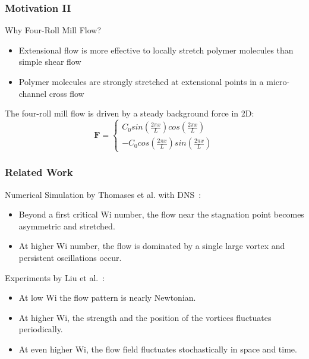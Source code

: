 \begin{frame}
  \frametitle{Motivation II}

  \begin{block}{Why Four-Roll Mill Flow?}
    \begin{itemize}
    \item Extensional flow is more effective to locally 
          stretch polymer molecules than simple shear flow
\item Polymer molecules are strongly stretched at extensional points in a micro-channel cross flow
    \end{itemize}

  \end{block}
The four-roll mill flow is driven by a steady background force in 2D:
\begin{equation}
\mathbf{F}=\left\{\begin{matrix}
C_0sin(\frac{2\pi x} {L})cos(\frac{2\pi x} {L})
\\ 
-C_0cos(\frac{2\pi x} {L})sin(\frac{2\pi x} {L})
\end{matrix}\right.
\end{equation}
\end{frame}

\begin{frame}
  \frametitle{Related Work}
\begin{block}{Numerical Simulation by Thomases et al. with DNS~\footnotemark: }
\begin{itemize}
 \item Beyond a first critical Wi number, the flow near the stagnation point becomes asymmetric and stretched.
\item At higher Wi number, the flow is dominated by a single large vortex and persistent oscillations occur. 
\end{itemize}
\end{block}
\begin{block}{Experiments by Liu et al.~\footnotemark[2]:}
\begin{itemize}
 \item  At low Wi the flow pattern is nearly Newtonian. 
\item At higher Wi, the strength and the position of the vortices fluctuates periodically.
\item At even higher Wi, the flow field fluctuates stochastically in space and time.
\end{itemize}
\end{block}
\end{frame}


